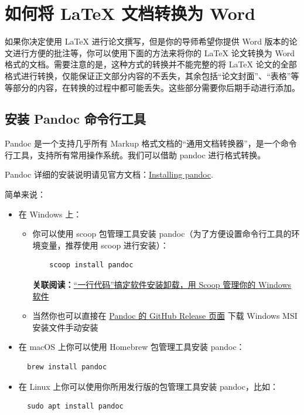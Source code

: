 \section{如何将 {\LaTeX} 文档转换为 Word}

如果你决定使用 {\LaTeX} 进行论文撰写，但是你的导师希望你提供 Word 版本的论文进行方便的批注等，你可以使用下面的方法来将你的 {\LaTeX} 论文转换为 Word 格式的文档。需要注意的是，这种方式的转换并不能完整的将 {\LaTeX} 论文的全部格式进行转换，仅能保证正文部分内容的不丢失，其余包括“论文封面”、“表格”等等部分的内容，在转换的过程中都可能丢失。这些部分需要你后期手动进行添加。

\subsection{安装 Pandoc 命令行工具}

Pandoc 是一个支持几乎所有 Markup 格式文档的“通用文档转换器”，是一个命令行工具，支持所有常用操作系统。我们可以借助 pandoc 进行格式转换。

Pandoc 详细的安装说明请见官方文档：\href{https://pandoc.org/installing.html}{Installing pandoc}.

简单来说：

\begin{itemize}
  \item 在 Windows 上：
  \begin{itemize}
    \item 你可以使用 scoop 包管理工具安装 pandoc（为了方便设置命令行工具的环境变量，推荐使用 scoop 进行安装）：
    \begin{verbatim}
    scoop install pandoc
    \end{verbatim}
    \textbf{关联阅读：}\href{https://sspai.com/post/52496}{“一行代码”搞定软件安装卸载，用 Scoop 管理你的 Windows 软件}
    \item 当然你也可以直接在 \href{https://github.com/jgm/pandoc/releases/latest}{Pandoc 的 GitHub Release 页面} 下载 Windows MSI 安装文件手动安装
  \end{itemize}
  \item 在 macOS 上你可以使用 Homebrew 包管理工具安装 pandoc：
  \begin{verbatim}
  brew install pandoc
  \end{verbatim}
  \item 在 Linux 上你可以使用你所用发行版的包管理工具安装 pandoc，比如：
  \begin{verbatim}
  sudo apt install pandoc
  \end{verbatim}
\end{itemize}

